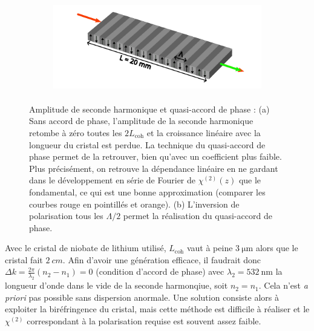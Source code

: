 \documentclass[11pt,a4paper]{article}
\newcommand{\lmbd}[1]{$\SI{#1}{\nano\metre}$}
\newcommand{\mathsc}[1]{\mathrm{\scriptscriptstyle {#1}}}
\begin{document}
\begin{figure}[htpb] 
\centering
\begin{subfigure}[b]{0.48\textwidth}
	\centering
	\hspace*{-0.8cm}
	
	\vspace*{-1cm}
	\caption{}
	\label{fig:agen}
\end{subfigure}
\begin{subfigure}[b]{0.48\textwidth}
	\includegraphics[height=4cm]{./img/PP.pdf}
	\vspace*{0.8cm}
	\caption{}
	\label{fig:inversion}
\end{subfigure}
\hspace*{-0.6cm}
\caption{Amplitude de seconde harmonique et quasi-accord de phase : (a) \small  Sans accord de phase, l'amplitude de la seconde harmonique retombe à zéro toutes les $2L_\mathsc{coh}$ et la croissance linéaire avec la longueur du cristal est perdue. La technique du quasi-accord de phase permet de la retrouver, bien qu'avec un coefficient plus faible. Plus précisément, on retrouve la dépendance linéaire en ne gardant dans le développement en série de Fourier de $\chi^{(2)}(z)$ que le fondamental, ce qui est une bonne approximation (comparer les courbes rouge en pointillés et orange).  (b) L'inversion de polarisation tous les $\Lambda/2$ permet la réalisation du quasi-accord de phase.} %
\label{fig:QPM}
\end{figure}

Avec le cristal de niobate de lithium utilisé, $L_\mathsc{coh}$ vaut à peine $\SI{3}{\micro\meter}$ alors que le cristal fait $\SI{2}{cm}$.
Afin d'avoir une génération efficace, il faudrait donc $\Delta k = \frac{2\pi}{\lambda_2}(n_2-n_1) = 0$ (condition d'accord de phase) avec $\lambda_2=$\lmbd{532} la longueur d'onde dans le vide de la seconde harmonqiue, soit $n_2 = n_1$. Cela n'est \textit{a priori} pas possible sans dispersion anormale. Une solution consiste alors à exploiter la biréfringence du cristal, mais cette méthode est difficile à réaliser et le $\chi^{(2)}$ correspondant à la polarisation requise est souvent assez faible. 
\end{document}
